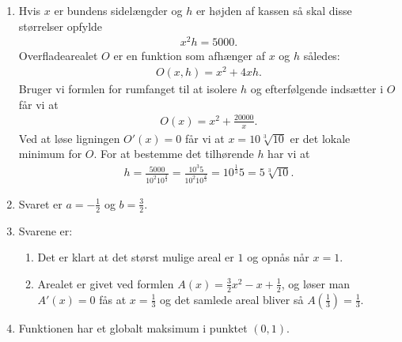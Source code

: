 \begin{enumerate}
	
	\item Hvis $x$ er bundens sidelængder og $h$ er højden af kassen så skal disse størrelser opfylde
	\begin{align*}
	x^2h=5000.
	\end{align*}
	Overfladearealet $O$ er en funktion som afhænger af $x$ og $h$ således:
	\begin{align*}
	O(x,h)=x^2+4xh.
	\end{align*}
	Bruger vi formlen for rumfanget til at isolere $h$ og efterfølgende indsætter i $O$ får vi at
	\begin{align*}
	O(x)=x^2+\frac{20000}{x}.
	\end{align*}
	Ved at løse ligningen $O'(x)=0$ får vi at $x=10\sqrt[3]{10}$ er det lokale minimum for $O$. For at bestemme det tilhørende $h$
	har vi at
	\begin{align*}
	h=\frac{5000}{10^2 10^{\frac{2}{3}}}=\frac{10^3 5}{10^2 10^{\frac{2}{3}}}=10^{\frac{1}{3}}5=5\sqrt[3]{10}.
	\end{align*}
	
	\item Svaret er $a=-\frac{1}{2}$ og $b=\frac{3}{2}$.
		
	\item \label{it:opt2ans} Svarene er:
	\begin{enumerate}
		\item Det er klart at det størst mulige areal er $1$ og opnås når $x=1$.
		\item Arealet er givet ved formlen $A(x)=\frac{3}{2}x^2-x+\frac{1}{2}$, og løser man $A'(x)=0$ fås at $x=\frac{1}{3}$ og det samlede areal bliver så $A(\frac{1}{3})=\frac{1}{3}$.
	\end{enumerate}
%	
	
	\item Funktionen har et globalt maksimum i punktet $(0,1)$.
	

\end{enumerate}
